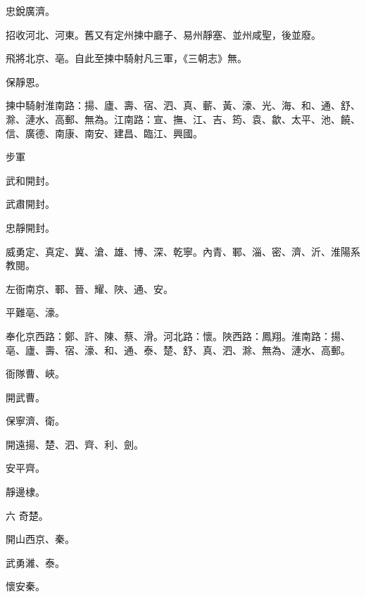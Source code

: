\begin{pinyinscope}
 忠銳廣濟。



 招收河北、河東。舊又有定州揀中廳子、易州靜塞、並州咸聖，後並廢。



 飛將北京、亳。自此至揀中騎射凡三軍，《三朝志》無。



 保靜恩。



 揀中騎射淮南路：揚、廬、壽、宿、泗、真、蘄、黃、濠、光、海、和、通、舒、滁、漣水、高郵、無為。江南路：宣、撫、江、吉、筠、袁、歙、太平、池、饒、信、廣德、南康、南安、建昌、臨江、興國。



 步軍



 武和開封。



 武肅開封。



 忠靜開封。



 威勇定、真定、冀、滄、雄、博、深、乾寧。內青、鄆、淄、密、濟、沂、淮陽系教閱。



 左衙南京、鄆、晉、耀、陜、通、安。



 平難亳、濠。



 奉化京西路：鄭、許、陳、蔡、滑。河北路：懷。陜西路：鳳翔。淮南路：揚、亳、廬、壽、宿、濠、和、通、泰、楚、舒、真、泗、滁、無為、漣水、高郵。



 衙隊曹、峽。



 開武曹。



 保寧濟、衛。



 開遠揚、楚、泗、齊、利、劍。



 安平齊。



 靜邊棣。



 六
 奇楚。



 開山西京、秦。



 武勇濰、泰。



 懷安秦。




\end{pinyinscope}
